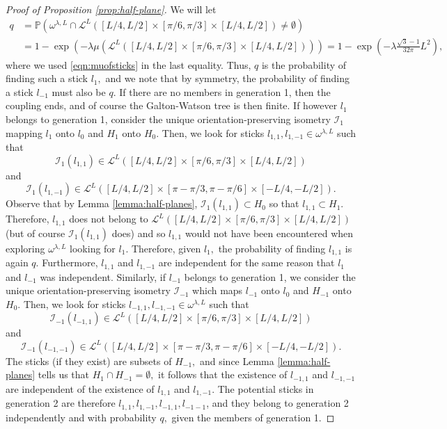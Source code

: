 \documentclass[a4paper,12pt]{article}
\newcommand{\BP}{{\mathbb{P}}}
\newcommand{\CI}{{\mathcal{I}}}
\newcommand{\CL}{{\mathcal{L}}}
\begin{document}
\begin{proof}[Proof of Proposition \ref{prop:half-plane}]
We will let 
\begin{align} \label{eqn:qdef}
 q& =\BP(\omega^{\lambda,L}\cap \CL^L([L/4,L/2]\times [\pi/6,\pi/3]\times [L/4,L/2])\neq \emptyset) \\
& =1-\exp(-\lambda \mu(\CL^L([L/4,L/2]\times [\pi/6,\pi/3]\times [L/4,L/2]))) =1-\exp\left(-\lambda \frac{\sqrt{3}-1}{32 \pi}L^2\right), \nonumber
\end{align}
where we used \eqref{eqn:muofsticks} in the last equality. Thus, $q$ is the probability 
of finding such a stick $l_1,$ and we note that by symmetry, the probability of finding 
a stick $l_{-1}$ must also be $q.$
If there are no members in generation 1, then the coupling ends, and of course the Galton-Watson 
tree is then finite. If however $l_1$ belongs to generation 1, consider the unique 
orientation-preserving isometry 
$\CI_1$ mapping $l_1$ onto $l_0$ and $H_1$ onto $H_0.$ Then, we look for sticks 
$l_{1,1},l_{1,-1} \in \omega^{\lambda,L}$ such that 
\[
\CI_1(l_{1,1})\in \CL^L([L/4,L/2]\times [\pi/6,\pi/3]\times [L/4,L/2])
\]
and 
\[
\CI_1(l_{1,-1})\in \CL^L([L/4,L/2]\times [\pi-\pi/3,\pi-\pi/6]\times [-L/4,-L/2]).
\]
Observe that by Lemma \ref{lemma:half-planes},
$\CI_1(l_{1,1})\subset H_0$ so that $l_{1,1}\subset H_1.$ Therefore, 
$l_{1,1}$ does not belong to $\CL^L([L/4,L/2]\times [\pi/6,\pi/3]\times [L/4,L/2])$ 
(but of course $\CI_1(l_{1,1})$ does) and so $l_{1,1}$
would not have been encountered when exploring $\omega^{\lambda,L}$ looking for $l_1.$ Therefore, 
given $l_1,$ the probability of finding $l_{1,1}$ is again $q.$ Furthermore, $l_{1,1}$ and $l_{1,-1}$
are independent for the same reason that $l_1$ and $l_{-1}$ was independent.
Similarly, if $l_{-1}$ belongs to generation 1, 
we consider the unique orientation-preserving isometry $\CI_{-1}$ which maps $l_{-1}$ onto $l_0$ and 
$H_{-1}$ onto $H_0.$ Then, we look for sticks $l_{-1,1},l_{-1,-1} \in \omega^{\lambda,L}$ 
such that 
\[
\CI_{-1}(l_{-1,1})\in \CL^L([L/4,L/2]\times [\pi/6,\pi/3]\times [L/4,L/2])
\]
and 
\[
\CI_{-1}(l_{-1,-1})\in \CL^L([L/4,L/2]\times [\pi-\pi/3,\pi-\pi/6]\times [-L/4,-L/2]).
\]
The sticks (if they exist) are subsets of 
$H_{-1},$ and since Lemma \ref{lemma:half-planes} tells us that $H_1 \cap H_{-1}=\emptyset,$
it follows that the existence of $l_{-1,1}$ and $l_{-1,-1}$ are independent of the existence
of $l_{1,1}$ and $l_{1,-1}.$ The potential sticks in generation 2 are therefore 
$l_{1,1},l_{1,-1},l_{-1,1},l_{-1-1}$, and they belong to generation 2
independently and with probability $q,$ given the members of generation 1.


\end{proof}
\end{document}
